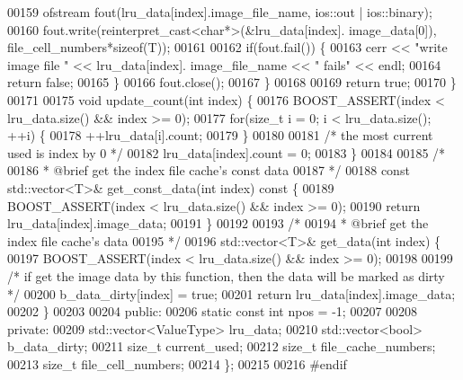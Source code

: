 \begin{DoxyCode}
00159                         ofstream fout(lru\_data[index].image\_file\_name, ios::out
       | ios::binary);
00160                         fout.write(reinterpret\_cast<char*>(&lru\_data[index].
      image\_data[0]), file\_cell\_numbers*\textcolor{keyword}{sizeof}(T));
00161 
00162                         \textcolor{keywordflow}{if}(fout.fail()) \{
00163                                 cerr << \textcolor{stringliteral}{"write image file "} << lru\_data[index].
      image\_file\_name << \textcolor{stringliteral}{" fails"} << endl;
00164                                 \textcolor{keywordflow}{return} \textcolor{keyword}{false};
00165                         \}
00166                         fout.close();
00167                 \}
00168 
00169                 \textcolor{keywordflow}{return} \textcolor{keyword}{true};
00170         \}
00171 
00175         \textcolor{keywordtype}{void} update_count(\textcolor{keywordtype}{int} index) \{
00176                 BOOST\_ASSERT(index < lru\_data.size() && index >= 0);
00177                 \textcolor{keywordflow}{for}(\textcolor{keywordtype}{size\_t} i = 0; i < lru\_data.size(); ++i) \{
00178                         ++lru\_data[i].count;
00179                 \}
00180 
00181                 \textcolor{comment}{/* the most current used is index by 0 */}
00182                 lru\_data[index].count = 0;
00183         \}
00184 
00185         \textcolor{comment}{/*}
00186 \textcolor{comment}{         *      @brief get the index file cache's const data}
00187 \textcolor{comment}{         */}
00188         \textcolor{keyword}{const} std::vector<T>& get\_const\_data(\textcolor{keywordtype}{int} index)\textcolor{keyword}{ const }\{
00189                 BOOST\_ASSERT(index < lru\_data.size() && index >= 0);
00190                 \textcolor{keywordflow}{return} lru\_data[index].image\_data;
00191         \}
00192 
00193         \textcolor{comment}{/*}
00194 \textcolor{comment}{         *      @brief get the index file cache's data}
00195 \textcolor{comment}{         */}
00196         std::vector<T>& get\_data(\textcolor{keywordtype}{int} index) \{
00197                 BOOST\_ASSERT(index < lru\_data.size() && index >= 0);
00198                 
00199                 \textcolor{comment}{/* if get the image data by this function, then the data will
       be marked as dirty */}
00200                 b\_data\_dirty[index] = \textcolor{keyword}{true};
00201                 \textcolor{keywordflow}{return} lru\_data[index].image\_data;
00202         \}
00203 
00204 \textcolor{keyword}{public}:
00206         \textcolor{keyword}{static} \textcolor{keyword}{const} \textcolor{keywordtype}{int} npos = -1;
00207 
00208 \textcolor{keyword}{private}:
00209         std::vector<ValueType> lru\_data;
00210         std::vector<bool> b\_data\_dirty;
00211         \textcolor{keywordtype}{size\_t} current\_used;
00212         \textcolor{keywordtype}{size\_t} file\_cache\_numbers;
00213         \textcolor{keywordtype}{size\_t} file\_cell\_numbers;
00214 \};
00215 
00216 \textcolor{preprocessor}{#endif}
\end{DoxyCode}
